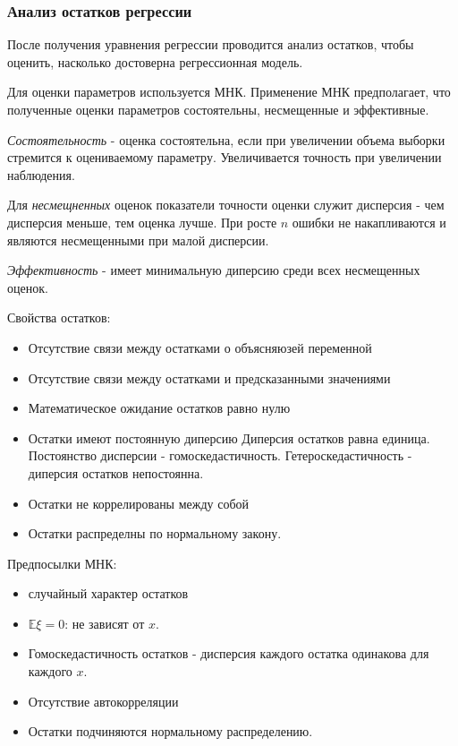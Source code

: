\documentclass[aps,%
12pt,%
final,%
oneside,
onecolumn,%
musixtex, %
superscriptaddress,%
centertags]{article} %
\begin{document}
\subsubsection{Анализ остатков регрессии}

После получения уравнения регрессии проводится анализ остатков, чтобы оценить, насколько достоверна регрессионная модель.

Для оценки параметров используется МНК. Применение МНК предполагает, что полученные оценки параметров состоятельны, несмещенные и эффективные.

\textit{Состоятельность} - оценка состоятельна, если при увеличении объема выборки стремится к оцениваемому параметру. Увеличивается точность при увеличении наблюдения.

Для \textit{несмещненных} оценок показатели точности оценки служит дисперсия - чем дисперсия меньше, тем оценка лучше. При росте $n$ ошибки не накапливаются и являются несмещенными при малой дисперсии.

\textit{Эффективность} - имеет минимальную диперсию среди всех несмещенных оценок.

Свойства остатков:

\begin{itemize}
	\item Отсутствие связи между остатками о объясняюзей переменной
	\item Отсутствие связи между остатками и предсказанными значениями
	\item Математическое ожидание остатков равно нулю
	\item Остатки имеют постоянную диперсию Диперсия остатков равна единица. Постоянство дисперсии - гомоскедастичность. Гетероскедастичность - диперсия остатков непостоянна.
	\item Остатки не коррелированы между собой
	\item Остатки распределны по нормальному закону.
\end{itemize}

Предпосылки МНК:
\begin{itemize}
	\item случайный характер остатков
	\item $\mathbb{E} \xi = 0$: не зависят от $x$.
	\item Гомоскедастичность остатков - дисперсия каждого остатка одинакова для каждого $x$.
	\item Отсутствие автокорреляции
	\item Остатки подчиняются нормальному распределению.
\end{itemize}
\end{document}
